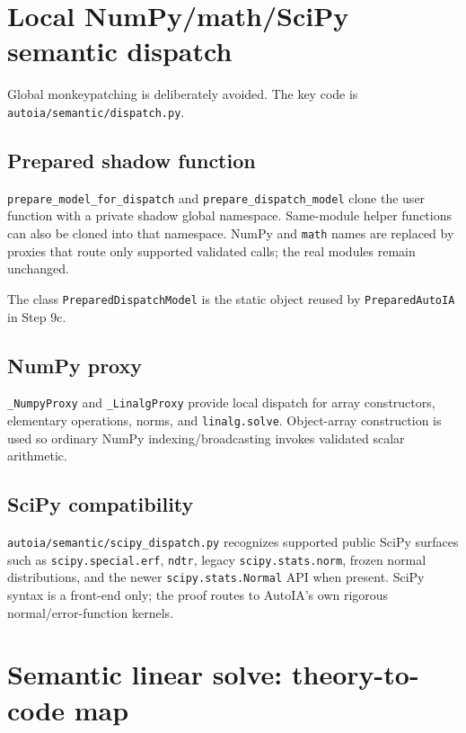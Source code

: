 \documentclass[11pt]{article}
\newcommand{\codepath}[1]{\nolinkurl{#1}}
\begin{document}
\section{Local NumPy/math/SciPy semantic dispatch}

Global monkeypatching is deliberately avoided.  The key code is
\codepath{autoia/semantic/dispatch.py}.

\subsection{Prepared shadow function}

\texttt{prepare\_model\_for\_dispatch} and
\texttt{prepare\_dispatch\_model} clone the user function with a private shadow
global namespace.  Same-module helper functions can also be cloned into that
namespace.  NumPy and \texttt{math} names are replaced by proxies that route only
supported validated calls; the real modules remain unchanged.

The class \texttt{PreparedDispatchModel} is the static object reused by
\texttt{PreparedAutoIA} in Step 9c.

\subsection{NumPy proxy}

\texttt{\_NumpyProxy} and \texttt{\_LinalgProxy} provide local dispatch for
array constructors, elementary operations, norms, and \texttt{linalg.solve}.
Object-array construction is used so ordinary NumPy indexing/broadcasting invokes
validated scalar arithmetic.

\subsection{SciPy compatibility}

\codepath{autoia/semantic/scipy_dispatch.py} recognizes supported public SciPy
surfaces such as \texttt{scipy.special.erf}, \texttt{ndtr}, legacy
\texttt{scipy.stats.norm}, frozen normal distributions, and the newer
\texttt{scipy.stats.Normal} API when present.  SciPy syntax is a front-end only;
the proof routes to AutoIA's own rigorous normal/error-function kernels.

\section{Semantic linear solve: theory-to-code map}
\end{document}
